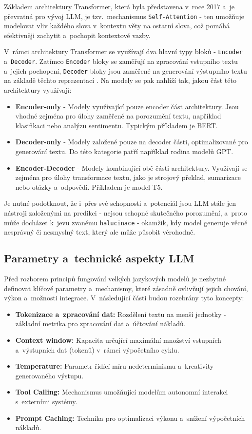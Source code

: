 \documentclass[czech, ing, kiv, he, iso690numb, viewonly]{fasthesis}
\begin{document}
Základem architektury Transformer, která byla představena v~roce 2017 \cite{vaswani2017attention} a~je převratná pro vývoj LLM, je tzv.~mechanismus \texttt{Self-Attention} - ten umožňuje modelovat vliv každého slova v~kontextu věty na ostatní slova, což pomáhá efektivněji zachytit 
a~pochopit kontextové vazby.

V~rámci architektury Transformer se využívají dva hlavní typy bloků - \texttt{Encoder} a~\texttt{Decoder}. Zatímco \texttt{Encoder} bloky se zaměřují na zpracování vstupního textu a~jejich pochopení, \texttt{Decoder} bloky jsou zaměřené na generování výstupního textu na základě těchto reprezentací \cite{wang2025history}. Na modely se pak 
nahlíží tak, jakou část této architektury využívají:

\begin{itemize}
\item \textbf{Encoder-only} - Modely využívající pouze encoder část architektury. Jsou vhodné zejména pro úlohy zaměřené na porozumění textu, například klasifikaci nebo analýzu sentimentu. Typickým příkladem je BERT.
\item \textbf{Decoder-only} - Modely založené pouze na decoder části, optimalizované pro generování textu. Do této kategorie patří například rodina modelů GPT.
\item \textbf{Encoder-Decoder} - Modely kombinující obě části architektury. Využívají se zejména pro úlohy transformace textu, jako je strojový překlad, sumarizace nebo otázky a~odpovědi. Příkladem je model T5.
\end{itemize}

Je nutné podotknout, že i~přes své schopnosti a~potenciál jsou LLM stále jen nástroji založenými na predikci - nejsou schopné skutečného porozumění, 
a~proto může docházet k~jevu zvanému \texttt{halucinace} - okamžik, kdy model generuje věcně nesprávný či nesmyslný text, který ale může působit věrohodně.

\subsection{Parametry a~technické aspekty LLM}
Před rozborem principů fungování velkých jazykových modelů je 
nezbytné definovat klíčové parametry a~mechanismy, které zásadně ovlivňují 
jejich chování, výkon a~možnosti integrace. V~následující části budou rozebrány tyto koncepty:

\begin{itemize}
    \item \textbf{Tokenizace a~zpracování dat:} Rozdělení textu na menší jednotky - základní metrika pro zpracování dat a~účtování nákladů.
    \item \textbf{Context window:} Kapacita určující maximální množství vstupních a~výstupních dat (tokenů) v~rámci výpočetního cyklu.
    \item \textbf{Temperature:} Parametr řídící míru nedeterminismu a~kreativity generovaného výstupu.
    \item \textbf{Tool Calling:} Mechanismus umožňující modelům autonomní interakci s~externími systémy.
    \item \textbf{Prompt Caching:} Technika pro optimalizaci výkonu a~snížení výpočetních nákladů.
\end{itemize}
\end{document}
